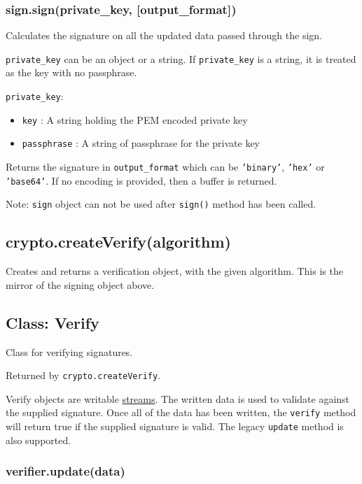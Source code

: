 \subsubsection{sign.sign(private\_key,
{[}output\_format{]})}\label{sign.signprivateux5fkey-outputux5fformat}

Calculates the signature on all the updated data passed through the
sign.

\texttt{private\_key} can be an object or a string. If
\texttt{private\_key} is a string, it is treated as the key with no
passphrase.

\texttt{private\_key}:

\begin{itemize}
\itemsep1pt\parskip0pt
\item
  \texttt{key} : A string holding the PEM encoded private key
\item
  \texttt{passphrase} : A string of passphrase for the private key
\end{itemize}

Returns the signature in \texttt{output\_format} which can be
\texttt{'binary'}, \texttt{'hex'} or \texttt{'base64'}. If no encoding
is provided, then a buffer is returned.

Note: \texttt{sign} object can not be used after \texttt{sign()} method
has been called.

\subsection{crypto.createVerify(algorithm)}\label{crypto.createverifyalgorithm}

Creates and returns a verification object, with the given algorithm.
This is the mirror of the signing object above.

\subsection{Class: Verify}\label{class-verify}

Class for verifying signatures.

Returned by \texttt{crypto.createVerify}.

Verify objects are writable \href{stream.html}{streams}. The written
data is used to validate against the supplied signature. Once all of the
data has been written, the \texttt{verify} method will return true if
the supplied signature is valid. The legacy \texttt{update} method is
also supported.

\subsubsection{verifier.update(data)}\label{verifier.updatedata}

